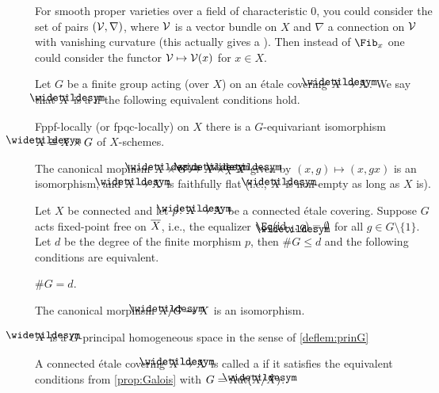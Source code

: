 \begin{rem}
	For smooth proper varieties over a field of characteristic $0$, you could consider the set of pairs $(\mathcal{V},\nabla)$, where $\mathcal{V}$ is a vector bundle on $X$ and $\nabla$ a connection on $\mathcal{V}$ with vanishing curvature (this actually gives a ). Then instead of $\Fib_x$ one could consider the functor $\mathcal{V}\mapsto\mathcal{V}(x)$ for $x\in X$.
\end{rem}
\begin{deflem}\label{deflem:prinG}
	Let $G$ be a finite group acting (over $X$) on an étale covering $\snake{X}\morphism X$. We say that $\snake{X}$ is a  if the following equivalent conditions hold.
	\begin{alphanumerate}
		\item Fppf-locally (or fpqc-locally) on $X$ there is a $G$-equivariant isomorphism $\snake{X}\cong X\times G$ of $X$-schemes.
		\item The canonical mophism $\snake{X}\times G\morphism\snake{X}\times_X\snake{X}$ given by $(x,g)\mapsto (x,gx)$ is an isomorphism, and $\snake{X}\morphism X$ is faithfully flat (i.e., $\snake{X}$ is non-empty as long as $X$ is).
	\end{alphanumerate}
\end{deflem}
\begin{prop}\label{prop:Galois}
	Let $X$ be connected and let $p\colon \snake{X}\morphism X$ be a connected étale covering. Suppose $G$ acts fixed-point free on $\ov{X}$, i.e., the equalizer $\Eq(\id_{\snake{X}},g)=\emptyset$ for all $g\in G\setminus\{1\}$. Let $d$ be the degree of the finite morphism $p$, then $\# G\leq d$ and the following conditions are equivalent.
	\begin{alphanumerate}
		\item $\# G=d$.
		\item The canonical morphism $\snake{X}/G\morphism X$ is an isomorphism.
		\item $\snake{X}$ is a $G$-principal homogeneous space in the sense of \cref{deflem:prinG}
	\end{alphanumerate}
\end{prop}
\begin{defi}\label{def:Galois}
	A connected étale covering $\snake{X}\morphism X$ is called a  if it satisfies the equivalent conditions from \cref{prop:Galois} with $G=\Aut(\snake{X}/X)$.
\end{defi}
